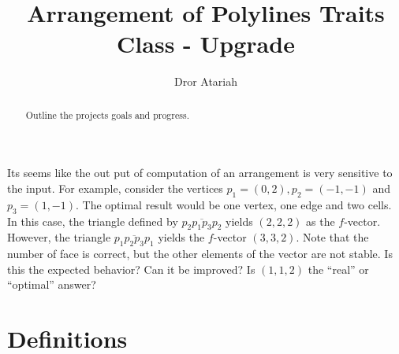 \documentclass[a4paper,10pt]{article}
\title{Arrangement of Polylines Traits Class - Upgrade}
\author{Dror Atariah}
\begin{document}
\maketitle

\begin{abstract}
  Outline the projects goals and progress.
\end{abstract}

\begin{queframe}
  Its seems like the out put of computation of an arrangement is very sensitive to the input.
  For example, consider the vertices \(p_1 = (0,2), p_2 = (-1,-1)\) and \(p_3 = (1,-1)\).
  The optimal result would be one vertex, one edge and two cells.
  In this case, the triangle defined by \(\overline{p_2 p_1 p_3 p_2}\) yields \((2,2,2)\) as the \(f\)-vector.
  However, the triangle \(\overline{p_1 p_2 p_3 p_1}\) yields the \(f\)-vector \((3,3,2)\).
  Note that the number of face is correct, but the other elements of the vector are not stable.
  Is this the expected behavior?
  Can it be improved?
  Is \((1,1,2)\) the ``real'' or ``optimal'' answer?
\end{queframe}


\section{Definitions}
\label{sec:definitions}
\end{document}
